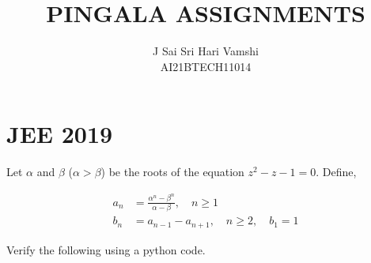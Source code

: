 \documentclass[journal,12pt,twocolumn]{IEEEtran}
\begin{document}
\title{\LARGE{PINGALA ASSIGNMENTS}}
\author{\normalsize J Sai Sri Hari Vamshi\\ \footnotesize AI21BTECH11014}
\date{}
\maketitle
\tableofcontents
\renewcommand{\thefigure}{\theenumi}
\renewcommand{\thetable}{\theenumi}
\bigskip    

\section{JEE 2019}
\noindent Let $\alpha$ and $\beta$ ($\alpha > \beta$) be the roots of the equation $z^2-z-1=0$. Define,

\begin{align}
	a_n & = \frac{\alpha^n-\beta^n}{\alpha-\beta}, \quad n \ge 1\\
	b_n & = a_{n-1} - a_{n+1}, \quad n \ge 2, \quad b_1 = 1
\end{align}

\noindent Verify the following using a python code.
\end{document}
